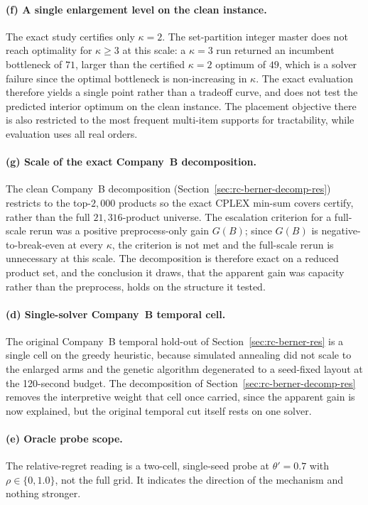 \documentclass[preprint,review,11pt,authoryear]{elsarticle}
\begin{document}
\paragraph{(f) A single enlargement level on the clean instance.}
The exact study certifies only $\kappa=2$. The set-partition integer master does not reach optimality for $\kappa\ge3$ at this scale: a $\kappa=3$ run returned an incumbent bottleneck of $71$, larger than the certified $\kappa=2$ optimum of $49$, which is a solver failure since the optimal bottleneck is non-increasing in $\kappa$. The exact evaluation therefore yields a single point rather than a tradeoff curve, and does not test the predicted interior optimum on the clean instance. The placement objective there is also restricted to the most frequent multi-item supports for tractability, while evaluation uses all real orders.

\paragraph{(g) Scale of the exact Company~B decomposition.}
The clean Company~B decomposition (Section~\ref{sec:rc-berner-decomp-res}) restricts to the top-$2{,}000$ products so the exact CPLEX min-sum covers certify, rather than the full $21{,}316$-product universe. The escalation criterion for a full-scale rerun was a positive preprocess-only gain $G(B)$; since $G(B)$ is negative-to-break-even at every $\kappa$, the criterion is not met and the full-scale rerun is unnecessary at this scale. The decomposition is therefore exact on a reduced product set, and the conclusion it draws, that the apparent gain was capacity rather than the preprocess, holds on the structure it tested.

\paragraph{(d) Single-solver Company~B temporal cell.}
The original Company~B temporal hold-out of Section~\ref{sec:rc-berner-res} is a single cell on the greedy heuristic, because simulated annealing did not scale to the enlarged arms and the genetic algorithm degenerated to a seed-fixed layout at the 120-second budget. The decomposition of Section~\ref{sec:rc-berner-decomp-res} removes the interpretive weight that cell once carried, since the apparent gain is now explained, but the original temporal cut itself rests on one solver.

\paragraph{(e) Oracle probe scope.}
The relative-regret reading is a two-cell, single-seed probe at $\theta'=0.7$ with $\rho \in \{0, 1.0\}$, not the full grid. It indicates the direction of the mechanism and nothing stronger.
\end{document}
